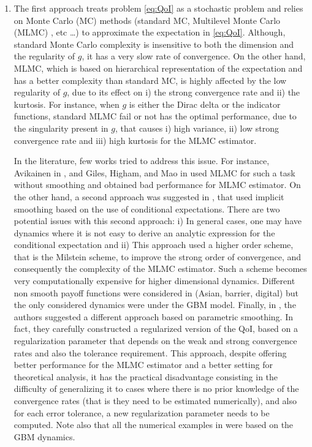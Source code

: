 \begin{enumerate}
\item The first approach treats problem \eqref{eq:QoI} as a stochastic problem and relies  on Monte Carlo (MC) methods (standard MC, Multilevel Monte Carlo (MLMC) \cite{giles2015multilevel}, etc \dots) to approximate the expectation in \eqref{eq:QoI}.  Although, standard Monte Carlo complexity  is insensitive to both the dimension and the regularity of $g$, it has a very slow rate of convergence. On the other hand, MLMC, which is based on hierarchical representation of the expectation and has a better complexity than standard MC,  is highly affected by the low regularity of $g$, due to its effect on i) the strong convergence rate and ii) the kurtosis. For instance, when $g$ is  either the Dirac delta or the indicator functions, standard MLMC  fail or not has the optimal performance, due to the singularity present in $g$, that causes  i) high variance, ii) low strong convergence rate and iii) high kurtosis for the MLMC estimator. 

In the literature, few works tried to address this issue. For instance, Avikainen in \cite{avikainen2009irregular}, and Giles, Higham, and Mao in \cite{giles2009analysing} used MLMC for such a task without smoothing and obtained bad performance for MLMC estimator.  On the other hand, a second approach  was suggested in  \cite{giles2008improved,giles2013numerical}, that used implicit smoothing based on the use of conditional expectations. There are two potential issues  with this second approach: i) In general cases, one may have dynamics where it is not easy to derive an  analytic expression for the conditional expectation and ii) This approach used a higher order scheme, that is the Milstein scheme, to improve the strong order of convergence, and consequently the complexity of the MLMC estimator. Such a scheme becomes very computationally expensive for higher dimensional dynamics. Different non smooth payoff functions were considered in \cite{giles2008improved,giles2013numerical} (Asian, barrier, digital)  but the only considered dynamics were under the GBM model. Finally, in \cite{giles2015multilevel}, the authors suggested a different approach based on parametric smoothing.  In fact, they carefully constructed a regularized version of the QoI, based on a  regularization parameter that depends on the weak and strong convergence rates and also  the tolerance requirement.  This approach, despite offering better performance for the MLMC estimator and a better setting for theoretical analysis, it has the practical disadvantage consisting in the difficulty of generalizing it to cases where there is no prior knowledge of the  convergence rates (that is they need to be estimated numerically), and also for each error tolerance, a new  regularization parameter needs to be computed. Note also that all the numerical examples in \cite{giles2015multilevel} were based on the GBM dynamics.


\end{enumerate}
